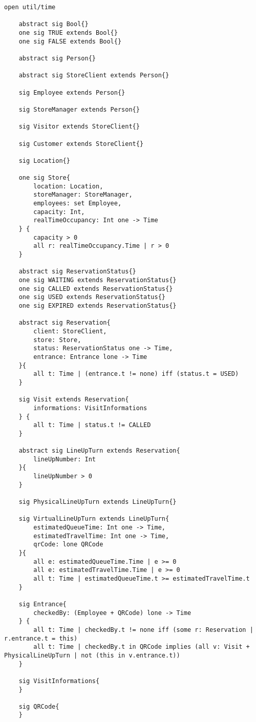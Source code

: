 \begin{lstlisting}[language=alloy]
    open util/time

    abstract sig Bool{}
    one sig TRUE extends Bool{}
    one sig FALSE extends Bool{}

    abstract sig Person{}

    abstract sig StoreClient extends Person{}

    sig Employee extends Person{}

    sig StoreManager extends Person{}

    sig Visitor extends StoreClient{}

    sig Customer extends StoreClient{}

    sig Location{}

    one sig Store{
        location: Location,
        storeManager: StoreManager,
        employees: set Employee,
        capacity: Int,
        realTimeOccupancy: Int one -> Time
    } {
        capacity > 0
        all r: realTimeOccupancy.Time | r > 0
    }

    abstract sig ReservationStatus{}
    one sig WAITING extends ReservationStatus{}
    one sig CALLED extends ReservationStatus{}
    one sig USED extends ReservationStatus{}
    one sig EXPIRED extends ReservationStatus{}

    abstract sig Reservation{
        client: StoreClient,
        store: Store,
        status: ReservationStatus one -> Time,
        entrance: Entrance lone -> Time
    }{
        all t: Time | (entrance.t != none) iff (status.t = USED)
    }

    sig Visit extends Reservation{
        informations: VisitInformations
    } {
        all t: Time | status.t != CALLED
    }

    abstract sig LineUpTurn extends Reservation{
        lineUpNumber: Int
    }{
        lineUpNumber > 0
    }

    sig PhysicalLineUpTurn extends LineUpTurn{}

    sig VirtualLineUpTurn extends LineUpTurn{
        estimatedQueueTime: Int one -> Time,
        estimatedTravelTime: Int one -> Time,
        qrCode: lone QRCode
    }{
        all e: estimatedQueueTime.Time | e >= 0
        all e: estimatedTravelTime.Time | e >= 0
        all t: Time | estimatedQueueTime.t >= estimatedTravelTime.t
    }

    sig Entrance{
        checkedBy: (Employee + QRCode) lone -> Time
    } {
        all t: Time | checkedBy.t != none iff (some r: Reservation | r.entrance.t = this)
        all t: Time | checkedBy.t in QRCode implies (all v: Visit + PhysicalLineUpTurn | not (this in v.entrance.t))
    }

    sig VisitInformations{
    }

    sig QRCode{
    }
\end{lstlisting}